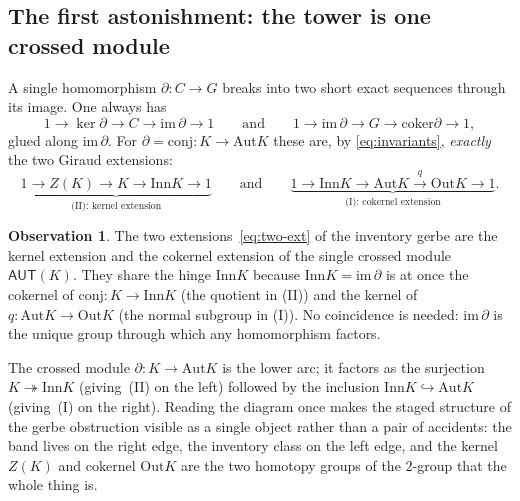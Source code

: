 \documentclass[11pt]{article}
\theoremstyle{definition}
\newtheorem{observation}[theorem]{Observation}
\newcommand{\Aut}{\mathrm{Aut}}
\newcommand{\Inn}{\mathrm{Inn}}
\newcommand{\Out}{\mathrm{Out}}
\newcommand{\conj}{\mathrm{conj}}
\newcommand{\coker}{\mathrm{coker}}
\newcommand{\AUT}{\mathsf{AUT}}
\begin{document}
\subsection{The first astonishment: the tower is one crossed module}

A single homomorphism $\partial\colon C\to G$ breaks into two short exact sequences through its
image. One always has
\[
1\to \ker\partial\to C\to \mathrm{im}\,\partial\to 1
\qquad\text{and}\qquad
1\to \mathrm{im}\,\partial\to G\to\coker\partial\to 1,
\]
glued along $\mathrm{im}\,\partial$. For $\partial=\conj\colon K\to\Aut K$ these are, by
\eqref{eq:invariants}, \emph{exactly} the two Giraud extensions:
\begin{equation}\label{eq:edges}
\underbrace{1\to Z(K)\to K\to \Inn K\to 1}_{\text{(II): kernel extension}}
\qquad\text{and}\qquad
\underbrace{1\to \Inn K\to \Aut K\xrightarrow{q}\Out K\to 1}_{\text{(I): cokernel extension}}.
\end{equation}

\begin{observation}\label{obs:hinge}
The two extensions~\eqref{eq:two-ext} of the inventory gerbe are the kernel extension and the
cokernel extension of the single crossed module $\AUT(K)$. They share the hinge $\Inn K$ because
$\Inn K=\mathrm{im}\,\partial$ is at once the cokernel of $\conj\colon K\to\Inn K$ (the quotient in
(II)) and the kernel of $q\colon\Aut K\to\Out K$ (the normal subgroup in (I)). No coincidence is
needed: $\mathrm{im}\,\partial$ is the unique group through which any homomorphism factors.
\end{observation}

\begin{center}
\end{center}

\noindent The crossed module $\partial\colon K\to\Aut K$ is the lower arc; it factors as the
surjection $K\twoheadrightarrow\Inn K$ (giving~(II) on the left) followed by the inclusion
$\Inn K\hookrightarrow\Aut K$ (giving~(I) on the right). Reading the diagram once makes the staged
structure of the gerbe obstruction visible as a single object rather than a pair of accidents: the
band lives on the right edge, the inventory class on the left edge, and the kernel $Z(K)$ and
cokernel $\Out K$ are the two homotopy groups of the $2$-group that the whole thing is.
\end{document}
